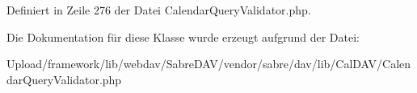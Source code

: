 Definiert in Zeile 276 der Datei Calendar\+Query\+Validator.\+php.



Die Dokumentation für diese Klasse wurde erzeugt aufgrund der Datei\+:\begin{DoxyCompactItemize}
\item 
Upload/framework/lib/webdav/\+Sabre\+D\+A\+V/vendor/sabre/dav/lib/\+Cal\+D\+A\+V/Calendar\+Query\+Validator.\+php\end{DoxyCompactItemize}
